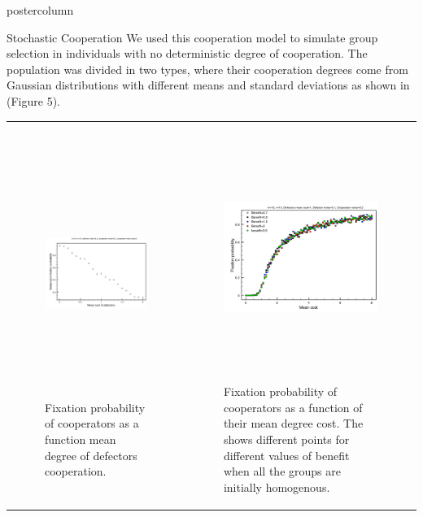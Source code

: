 \documentclass[final,hyperref={pdfpagelabels=false}]{beamer}
\begin{document}
\begin{frame}
\begin{columns}
\begin{column}{.49\textwidth}
\begin{beamercolorbox}[center,wd=\textwidth]{postercolumn}
\begin{minipage}[T]{.95\textwidth}
{\begin{block}{Stochastic Cooperation}
 \justifying We used this cooperation model to simulate group selection in individuals with no deterministic degree  of cooperation. The population was divided in two types, where their cooperation degrees come from Gaussian distributions with different means and standard deviations as shown in (Figure 5). 
  
                 
                  \begin{tabularx}{\linewidth}{ZZ}
                  \begin{figure}
                   \includegraphics[width=11cm,height=8cm]{images/fixprobabilityVsmean0.pdf}
                   \caption{Fixation probability of cooperators as a function mean degree of defectors cooperation.}
                   \end{figure}
                  
                    &
                    \begin{figure}
                     \includegraphics[width=11cm,height=8cm]{images/fixprobabilityVsmean1Benefit.pdf}
                     \caption{Fixation probability of cooperators as a function of their mean degree cost. The shows different points for different values of benefit when all the groups are initially homogenous.}
                    \end{figure}
                    \\
                                    

\end{tabularx}
\end{block}}
\end{minipage}
\end{beamercolorbox}
\end{column}
\end{columns}
\end{frame}
\end{document}
